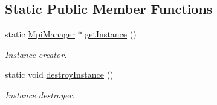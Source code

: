 \subsection*{Static Public Member Functions}
\begin{DoxyCompactItemize}
\item 
static \hyperlink{class_mpi_manager}{Mpi\+Manager} $\ast$ \hyperlink{class_mpi_manager_a486e424ae1b9dfa3218d260b0f9a0a2f}{get\+Instance} ()
\begin{DoxyCompactList}\small\item\em Instance creator. \end{DoxyCompactList}\item 
static void \hyperlink{class_mpi_manager_a03b7914615ccb6e7b8a285f50860d503}{destroy\+Instance} ()
\begin{DoxyCompactList}\small\item\em Instance destroyer. \end{DoxyCompactList}\end{DoxyCompactItemize}
